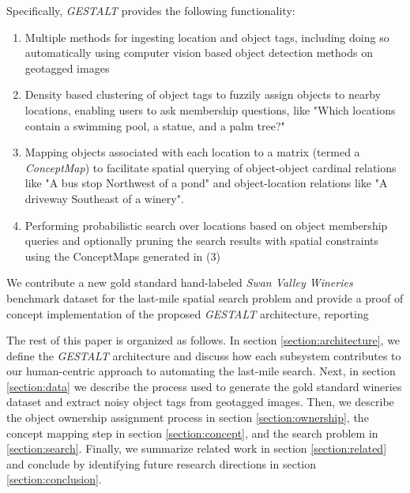 Specifically, \emph{GESTALT} provides the following functionality:
\begin{enumerate}
    \item Multiple methods for ingesting location and object tags, including doing so automatically using computer vision based object detection methods on geotagged images
    \item Density based clustering of object tags to fuzzily assign objects to nearby locations, enabling users to ask membership questions, like "Which locations contain a swimming pool, a statue, and a palm tree?"
    \item Mapping objects associated with each location to a matrix (termed a \emph{ConceptMap}) to facilitate spatial querying of object-object cardinal relations like "A bus stop Northwest of a pond" and object-location relations like "A driveway Southeast of a winery".
    \item Performing probabilistic search over locations based on object membership queries and optionally pruning the search results with spatial constraints using the ConceptMaps generated in (3)
\end{enumerate}

We contribute a new gold standard hand-labeled \textit{Swan Valley Wineries} benchmark dataset for the last-mile spatial search problem and provide a proof of concept implementation of the proposed \emph{GESTALT} architecture, reporting 

The rest of this paper is organized as follows. In section \ref{section:architecture}, we define the \emph{GESTALT} architecture and discuss how each subsystem contributes to our human-centric approach to automating the last-mile search. 
Next, in section \ref{section:data} we describe the process used to generate the gold standard wineries dataset and extract noisy object tags from geotagged images. Then, we describe the object ownership assignment process in section \ref{section:ownership}, the concept mapping step in section \ref{section:concept}, and the search problem in \ref{section:search}. 
Finally, we summarize related work in section \ref{section:related} and conclude by identifying future research directions in section \ref{section:conclusion}.


